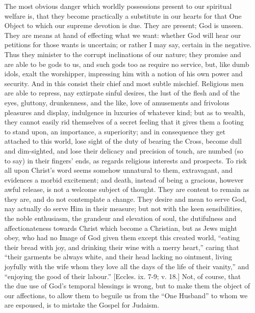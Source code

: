 The most obvious danger which worldly possessions present to our
spiritual welfare is, that they become practically a substitute in our
hearts for that One Object to which our supreme devotion is due. They
are present; God is unseen. They are means at hand of effecting what we
want: whether God will hear our petitions for those wants is uncertain;
or rather I may say, certain in the negative. Thus they minister to the
corrupt inclinations of our nature; they promise and are able to be gods
to us, and such gods too as require no service, but, like dumb idols,
exalt the worshipper, impressing him with a notion of his own power and
security. And in this consist their chief and most subtle mischief.
Religious men are able to repress, nay extirpate sinful desires, the
lust of the flesh and of the eyes, gluttony, drunkenness, and the like,
love of amusements and frivolous pleasures and display, indulgence in
luxuries of whatever kind; but as to wealth, they cannot easily rid
themselves of a secret feeling that it gives them a footing to stand
upon, an importance, a superiority; and in consequence they get attached
to this world, lose sight of the duty of bearing the Cross, become dull
and dim-sighted, and lose their delicacy and precision of touch, are
numbed (so to say) in their fingers' ends, as regards religious
interests and prospects. To risk all upon Christ's word seems somehow
unnatural to them, extravagant, and evidences a morbid excitement; and
death, instead of being a gracious, however awful release, is not a
welcome subject of thought. They are content to remain as they are, and
do not contemplate a change. They desire and mean to serve God, nay
actually do serve Him in their measure; but not with the keen
sensibilities, the noble enthusiasm, the grandeur and elevation of soul,
the dutifulness and affectionateness towards Christ which become a
Christian, but as Jews might obey, who had no Image of God given them
except this created world, ``eating their bread with joy, and
drinking their wine with a merry heart,'' caring that ``their
garments be always white, and their head lacking no ointment, living
joyfully with the wife whom they love all the days of the life of their
vanity,'' and ``enjoying the good of their labour.''
[Eccles. ix. 7-9; v. 18.] Not, of course, that the due use of God's
temporal blessings is wrong, but to make them the object of our
affections, to allow them to beguile us from the ``One Husband''
to whom we are espoused, is to mistake the Gospel for Judaism.

